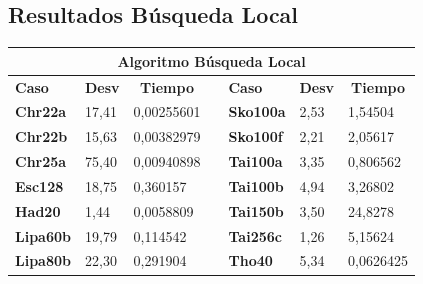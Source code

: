 \documentclass[a4paper, 12pt]{article}
\begin{document}
      \subsection{Resultados Búsqueda Local}
\begin{table}[H]
\centering
\label{my-label}
\begin{tabular}{|l|l|l|l|l|l|l|}
\hline
\multicolumn{7}{|c|}{\textbf{Algoritmo Búsqueda Local}}                                                                                                                                    \\ \hline
\textbf{Caso}    & \multicolumn{1}{c|}{\textbf{Desv}} & \multicolumn{1}{c|}{\textbf{Tiempo}} &  & \textbf{Caso}    & \multicolumn{1}{c|}{\textbf{Desv}} & \multicolumn{1}{c|}{\textbf{Tiempo}} \\ \cline{1-3} \cline{5-7} 
\textbf{Chr22a}  & 17,41                              & 0,00255601                           &  & \textbf{Sko100a} & 2,53                               & 1,54504                              \\ \cline{1-3} \cline{5-7} 
\textbf{Chr22b}  & 15,63                              & 0,00382979                           &  & \textbf{Sko100f} & 2,21                               & 2,05617                              \\ \cline{1-3} \cline{5-7} 
\textbf{Chr25a}  & 75,40                              & 0,00940898                           &  & \textbf{Tai100a} & 3,35                               & 0,806562                             \\ \cline{1-3} \cline{5-7} 
\textbf{Esc128}  & 18,75                              & 0,360157                             &  & \textbf{Tai100b} & 4,94                               & 3,26802                              \\ \cline{1-3} \cline{5-7} 
\textbf{Had20}   & 1,44                               & 0,0058809                            &  & \textbf{Tai150b} & 3,50                               & 24,8278                              \\ \cline{1-3} \cline{5-7} 
\textbf{Lipa60b} & 19,79                              & 0,114542                             &  & \textbf{Tai256c} & 1,26                               & 5,15624                              \\ \cline{1-3} \cline{5-7} 
\textbf{Lipa80b} & 22,30                              & 0,291904                             &  & \textbf{Tho40}   & 5,34                               & 0,0626425                            \\ \cline{1-3} \cline{5-7} 

\end{tabular}
\end{table}
\end{document}
